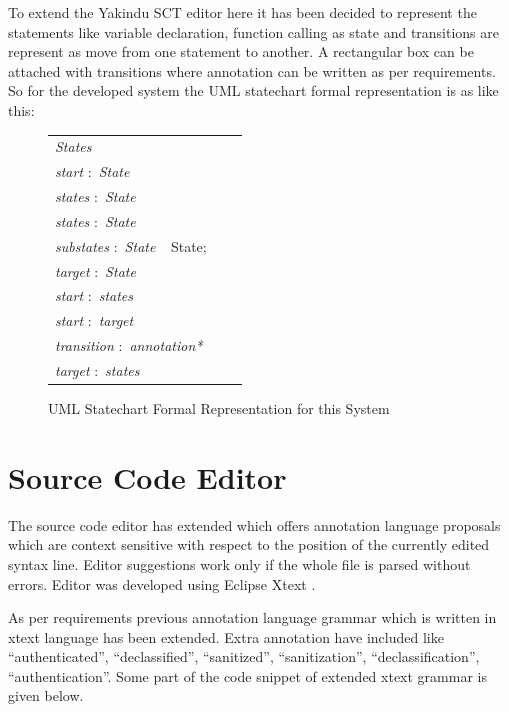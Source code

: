 To extend the Yakindu SCT editor here it has been decided to represent the statements like variable declaration, function calling as state and transitions are represent as move from one statement to another. A rectangular box can be attached with transitions where annotation can be written as per requirements. So for the developed system the UML statechart formal representation is as like this: 
\begin{figure}[ht!]
	\centering
	\begin{tabular}{lll}
	\footnotesize                       
	\textit{States}          \\
	\footnotesize                       
	\textit{start}          
	$:$  \textit{State}\\
	
	\textit{states}          
	$:$  \textit{State}\\
	
	\textit{states}           
	$:$  \textit{State}\\
	\footnotesize
	\textit{substates}            $:$         \textit{State} $\ \  $ {State};       \\   
	\footnotesize
	\textit{target}             $:$         \textit{State}    \\
	\footnotesize                       
	\textit{start}           
	$:$  \textit{states}\\
	\footnotesize                       
	\textit{start}          
	$:$ \textit{target}\\
	\footnotesize                       
	\textit{transition}          
	$:$ \textit{annotation*}\\
	\footnotesize                       
	\textit{target} $:$ \textit{states}        \\ 	
	\end{tabular}
	\caption{UML Statechart Formal Representation for this System}
	\label{statechart_formal_representation_for _this_system}
	\end{figure}
\section{Source Code Editor}
The source code editor has extended which offers annotation language proposals which are context sensitive with respect to the position of the currently edited syntax line. Editor suggestions work only if the whole file is parsed without errors. Editor was developed using Eclipse Xtext \cite{ref_17_xtext:grammar}.

As per requirements previous annotation language grammar which is written in xtext language has been extended. Extra annotation have included like \enquote{authenticated}, \enquote{declassified}, \enquote{sanitized}, \enquote{sanitization}, \enquote{declassification}, \enquote{authentication}. Some part of the code snippet of extended xtext grammar is given below.

